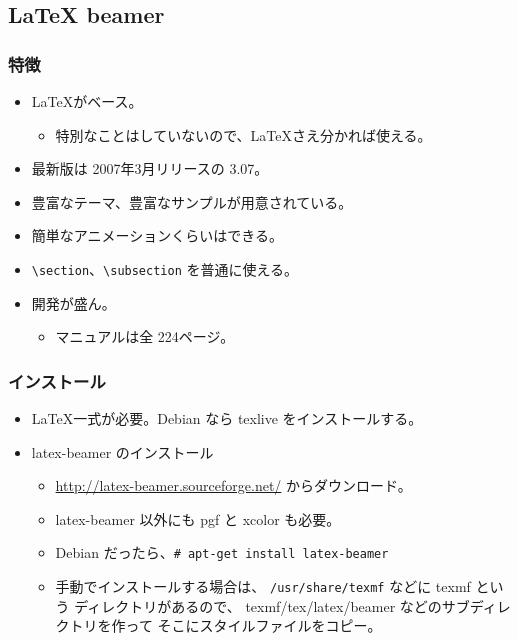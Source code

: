 \documentclass[mingoth,a4paper]{jsarticle}
\begin{document}
\subsection{LaTeX beamer}

\subsubsection{特徴}

\begin{itemize}
\item \LaTeX{}がベース。
  \begin{itemize}
  \item 特別なことはしていないので、\LaTeX{}さえ分かれば使える。
  \end{itemize}
\item 最新版は 2007年3月リリースの 3.07。
\item 豊富なテーマ、豊富なサンプルが用意されている。
\item 簡単なアニメーションくらいはできる。
\item \verb|\section|、\verb|\subsection| を普通に使える。
\item 開発が盛ん。
  \begin{itemize}
  \item マニュアルは全 224ページ。
  \end{itemize}
\end{itemize}

\newpage

\subsubsection{インストール}


\begin{itemize}
\item \LaTeX{}一式が必要。Debian なら texlive をインストールする。
\item latex-beamer のインストール
  \begin{itemize}
  \item \url{http://latex-beamer.sourceforge.net/} からダウンロード。
  \item latex-beamer 以外にも pgf と xcolor も必要。
  \item Debian だったら、\texttt{\# apt-get install latex-beamer}
  \item 手動でインストールする場合は、
    \texttt{/usr/share/texmf} などに texmf という
    ディレクトリがあるので、
    texmf/tex/latex/beamer などのサブディレクトリを作って
    そこにスタイルファイルをコピー。
  \end{itemize}
\end{itemize}
\end{document}
